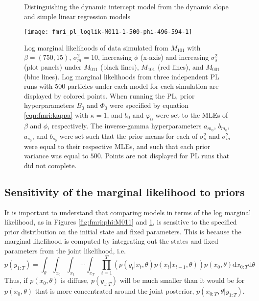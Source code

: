 \begin{figure}
\ssp
\centering
\caption{Distinguishing the dynamic intercept model from the dynamic slope and simple linear regression models} \label{fig:fmri:phi:M101}
\texttt{[image: fmri\_pl\_loglik-M011-1-500-phi-496-594-1]}
\caption*{Log marginal likelihoods of data simulated from $M_{101}$ with $\beta=(750,15)$, $\sigma^2_m = 10$, increasing $\phi$ (x-axis) and increasing $\sigma^2_s$ (plot panels) under $M_{011}$ (black lines), $M_{101}$ (red lines), and $M_{001}$ (blue lines). Log marginal likelihoods from three independent PL runs with 500 particles under each model for each simulation are displayed by colored points. When running the PL, prior hyperparameters $B_0$ and $\Phi_0$ were specified by equation \eqref{eqn:fmri:kappa} with $\kappa = 1$, and $b_0$ and $\varphi_0$ were set to the MLEs of $\beta$ and $\phi$, respectively. The inverse-gamma hyperparameters $a_{m_0}$, $b_{m_0}$, $a_{s_0}$, and $b_{s_0}$ were set such that the prior means for each of $\sigma^2_s$ and $\sigma^2_m$ were equal to their respective MLEs, and such that each prior variance was equal to $500$. Points are not displayed for PL runs that did not complete.}
\end{figure}

\subsection{Sensitivity of the marginal likelihood to priors \label{sec:fmri:kappa}}

It is important to understand that comparing models in terms of the log marginal likelihood, as in Figures \ref{fig:fmri:phi:M011} and \ref{fig:fmri:phi:M101}, is sensitive to the specified prior distribution on the initial state and fixed parameters. This is because the marginal likelihood is computed by integrating out the states and fixed parameters from the joint likelihood, i.e.
\begin{equation}
p(y_{1:T}) = \int_{\theta} \int_{x_0} \int_{x_1} \cdots \int_{x_T} \prod_{t=1}^T\left(p(y_t|x_t,\theta)p(x_t|x_{t-1},\theta)\right)p(x_0,\theta)\mbox{d}x_{0:T}\mbox{d}\theta \label{eqn:int:marg}
\end{equation}
Thus, if $p(x_0,\theta)$ is diffuse, $p(y_{1:T})$ will be much smaller than it would be for $p(x_0,\theta)$ that is more concentrated around the joint posterior, $p(x_{0:T},\theta|y_{1:T})$.

